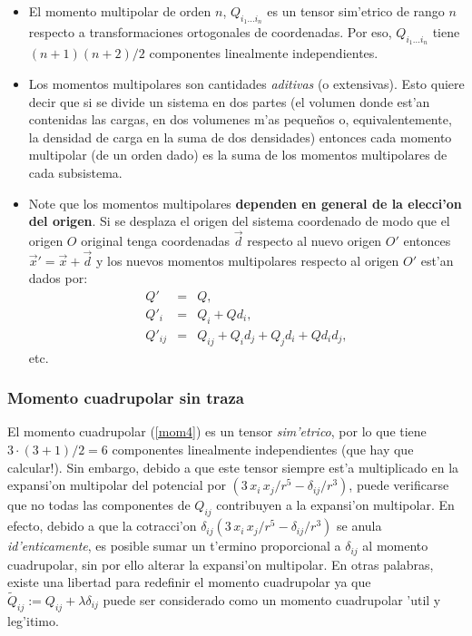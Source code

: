 \begin{itemize} 
\item El momento multipolar de orden $n$, $Q_{i_1\dots i_n}$ es un tensor sim'etrico de rango $n$ respecto a transformaciones ortogonales de coordenadas. Por eso, $Q_{i_1\dots i_n}$ tiene $(n+1)(n+2)/2$ componentes linealmente independientes.

\item Los momentos multipolares son cantidades \textit{aditivas} (o extensivas). Esto quiere decir que si se divide un sistema en dos partes (el volumen donde est'an contenidas las cargas, en dos volumenes m'as peque\~nos o, equivalentemente, la densidad de carga en la suma de dos densidades) entonces cada momento multipolar (de un orden dado) es la suma de los momentos multipolares de cada subsistema.

\item Note que los momentos multipolares \textbf{dependen en general de la
elecci'on del origen}. Si se desplaza el origen del sistema coordenado de modo que el origen $O$ original tenga coordenadas $\vec{d}$ respecto al nuevo origen $O'$ entonces
$\vec{x}'=\vec{x}+\vec{d}$ y los nuevos momentos multipolares respecto al origen $O'$ est'an dados por:
\begin{eqnarray}
 Q'&=&Q,\\
Q'_i&=&Q_i+Qd_i,\\
Q'_{ij}&=&Q_{ij}+Q_id_j+Q_jd_i+Qd_id_j,
\end{eqnarray}
etc.
\end{itemize}

\subsubsection{Momento cuadrupolar sin traza}\label{MCSM}
El momento cuadrupolar (\ref{mom4}) es un tensor \textit{sim'etrico}, por lo
que tiene ${3\cdot (3+1)}/{2}=6$ componentes linealmente independientes (que
hay que calcular!). Sin embargo, debido a que este tensor siempre est'a
multiplicado en la expansi'on multipolar del potencial por
$\left({3\,x_i\,x_j}/{r^5}-{\delta_{ij}}/{r^3}\right)$, puede
verificarse que no todas las componentes de $Q_{ij}$ contribuyen a la
expansi'on multipolar. En efecto, debido a que la cotracci'on
$\delta_{ij}\left({3\,x_i\,x_j}/{r^5}-{\delta_{ij}}/{r^3}\right)$ se
anula \textit{id'enticamente}, es posible sumar un t'ermino proporcional a
$\delta_{ij}$ al momento cuadrupolar, sin por ello alterar la expansi'on
multipolar. En otras palabras, existe una libertad para redefinir el momento
cuadrupolar ya que $\tilde{Q}_{ij}:=Q_{ij}+\lambda\delta_{ij}$ puede ser
considerado como un momento cuadrupolar 'util y leg'itimo. 

